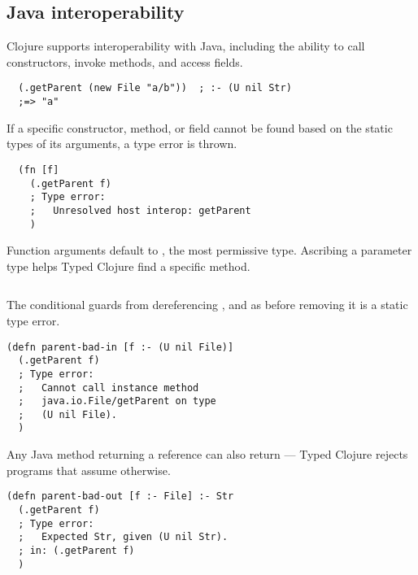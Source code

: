 \subsection{Java interoperability}
\label{sec:overviewjavainterop}

Clojure supports interoperability with Java, including the ability to
call constructors, invoke methods, and access fields.

\begin{verbatim}
  (.getParent (new File "a/b"))  ; :- (U nil Str)
  ;=> "a"
\end{verbatim}

If a specific constructor, method, or field cannot be found based on the
static types of its arguments, a type error is thrown.

\begin{verbatim}
  (fn [f] 
    (.getParent f)
    ; Type error:
    ;   Unresolved host interop: getParent
    )
\end{verbatim}

Function arguments default to , the most permissive type. Ascribing
a parameter type helps Typed Clojure find a specific method.


\begin{exmp}
\inputminted[firstline=6,lastline=8]{clojure}{code/demo/src/demo/parent3.clj}
\end{exmp}


The conditional guards from dereferencing , and as before
removing it is a static type error.

\begin{verbatim}
(defn parent-bad-in [f :- (U nil File)]
  (.getParent f)
  ; Type error:
  ;   Cannot call instance method 
  ;   java.io.File/getParent on type 
  ;   (U nil File).
  )
\end{verbatim}

Any Java method returning a reference can also return  ---
Typed Clojure rejects programs that assume otherwise.

\begin{verbatim}
(defn parent-bad-out [f :- File] :- Str
  (.getParent f)
  ; Type error:
  ;   Expected Str, given (U nil Str).
  ; in: (.getParent f)
  )
\end{verbatim}

